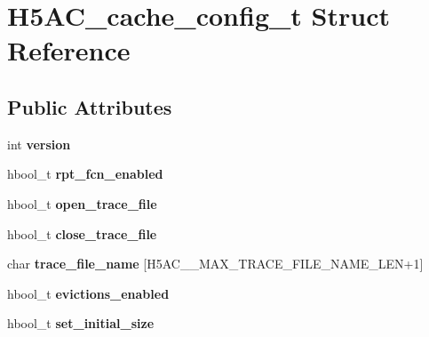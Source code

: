 \hypertarget{struct_h5_a_c__cache__config__t}{}\section{H5\+A\+C\+\_\+cache\+\_\+config\+\_\+t Struct Reference}
\label{struct_h5_a_c__cache__config__t}
\subsection*{Public Attributes}
\begin{DoxyCompactItemize}
\item 
\mbox{\label{struct_h5_a_c__cache__config__t_ae2d72e0a303db93762f9d496fcc31e07}} 
int {\bfseries version}
\item 
\mbox{\label{struct_h5_a_c__cache__config__t_afd6e2ba91d20c2c943681e89fa85a826}} 
hbool\+\_\+t {\bfseries rpt\+\_\+fcn\+\_\+enabled}
\item 
\mbox{\label{struct_h5_a_c__cache__config__t_ac33c02ca8425596b19d13aa66ef77ffd}} 
hbool\+\_\+t {\bfseries open\+\_\+trace\+\_\+file}
\item 
\mbox{\label{struct_h5_a_c__cache__config__t_a83a1952feee611a5e7932a266285f1cf}} 
hbool\+\_\+t {\bfseries close\+\_\+trace\+\_\+file}
\item 
\mbox{\label{struct_h5_a_c__cache__config__t_a609b6419be0338b9beda7ebc3dcf4ae8}} 
char {\bfseries trace\+\_\+file\+\_\+name} \mbox{[}H5\+A\+C\+\_\+\+\_\+\+M\+A\+X\+\_\+\+T\+R\+A\+C\+E\+\_\+\+F\+I\+L\+E\+\_\+\+N\+A\+M\+E\+\_\+\+L\+EN+1\mbox{]}
\item 
\mbox{\label{struct_h5_a_c__cache__config__t_a7399894b43bae2df78d23e3a4217c44f}} 
hbool\+\_\+t {\bfseries evictions\+\_\+enabled}
\item 
\mbox{\label{struct_h5_a_c__cache__config__t_ac444a95d5fbc11bc773822f2ffe47318}} 
hbool\+\_\+t {\bfseries set\+\_\+initial\+\_\+size}
\item 

\end{DoxyCompactItemize}
